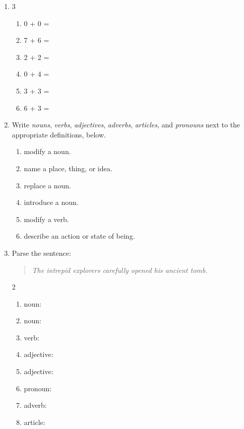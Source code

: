 \documentclass{tufte-book}
\begin{document}
\begin{enumerate}
  \item
  \begin{multicols}{3}
    \begin{enumerate}\bigskip
      \item 0 + 0 = \dotfill\bigskip
      \item 7 + 6 = \dotfill
      \item 2 + 2 = \dotfill\bigskip
      \item 0 + 4 = \dotfill
      \item 3 + 3 = \dotfill\bigskip
      \item 6 + 3 = \dotfill
    \end{enumerate}
  \end{multicols}

  \item
  Write \textit{nouns}, \textit{verbs}, \textit{adjectives},
  \textit{adverbs}, \textit{articles}, and \textit{pronouns}
  next to the appropriate definitions, below.\bigskip
  \begin{enumerate}
    \item \dotfill\bigskip modify a noun.
    \item \dotfill\bigskip name a place, thing, or idea.
    \item \dotfill\bigskip replace a noun.
    \item \dotfill\bigskip introduce a noun.
    \item \dotfill\bigskip modify a verb.
    \item \dotfill\bigskip describe an action or state of being.
  \end{enumerate}

  \item Parse the sentence:
  \begin{quote}
    \textit{The intrepid explorers carefully opened his ancient tomb.}
  \end{quote}
  \begin{multicols}{2}
    \begin{enumerate}\bigskip
      \item noun: \dotfill\bigskip
      \item noun: \dotfill\bigskip
      \item verb: \dotfill\bigskip
      \item adjective: \dotfill
      \item adjective: \dotfill\bigskip
      \item pronoun: \dotfill\bigskip
      \item adverb: \dotfill\bigskip
      \item article: \dotfill
    \end{enumerate}
  \end{multicols}


\end{enumerate}
\end{document}
